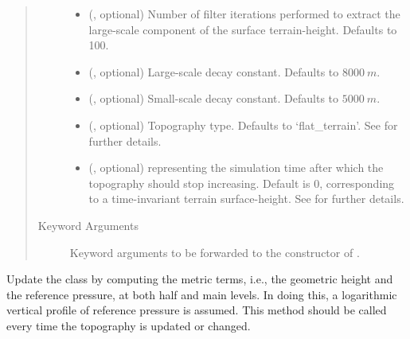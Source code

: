 \documentclass[letterpaper,10pt,english]{sphinxmanual}
\begin{document}
\begin{fulllineitems}
\begin{fulllineitems}
\begin{quote}
\begin{description}
\begin{itemize}
\item {} 
 (, optional) \textendash{} Number of filter iterations performed to extract the large-scale component of the surface terrain-height.
Defaults to 100.

\item {} 
 (, optional) \textendash{} Large-scale decay constant. Defaults to \(8000 ~ m\).

\item {} 
 (, optional) \textendash{} Small-scale decay constant. Defaults to \(5000 ~ m\).

\item {} 
 (, optional) \textendash{} Topography type. Defaults to ‘flat\_terrain’. See {\hyperref[\detokenize{api:module-tasmania.grids.topography}]{}} for further details.

\item {} 
 (, optional) \textendash{}  representing the simulation time after which the topography should stop
increasing. Default is 0, corresponding to a time-invariant terrain surface-height.
See {\hyperref[\detokenize{api:module-tasmania.grids.topography}]{}} for further details.

\end{itemize}

\item[{Keyword Arguments}] \leavevmode
{} \textendash{} Keyword arguments to be forwarded to the constructor of {\hyperref[\detokenize{api:tasmania.grids.topography.Topography1d}]{}}.

\end{description}\end{quote}

\end{fulllineitems}


\begin{fulllineitems}
\label{\detokenize{api:tasmania.grids.sleve.SLEVE2d._update_metric_terms}}
Update the class by computing the metric terms, i.e., the geometric height and the reference pressure,
at both half and main levels. In doing this, a logarithmic vertical profile of reference pressure is assumed.
This method should be called every time the topography is updated or changed.


\end{fulllineitems}
\end{fulllineitems}
\end{document}
